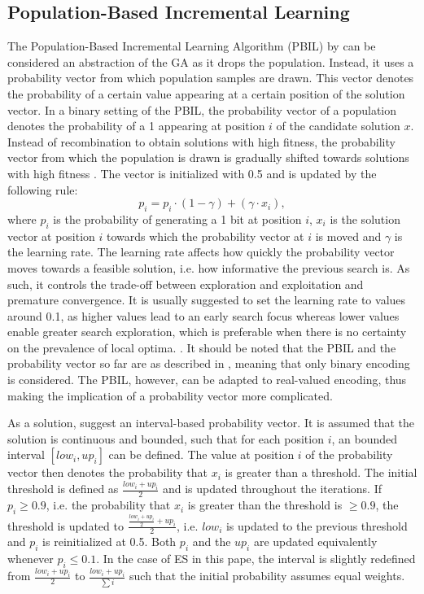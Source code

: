 \subsection{Population-Based Incremental Learning}
The Population-Based Incremental Learning Algorithm (PBIL) by \cite{baluja1994population} can be considered an abstraction of the GA as it drops the population. Instead, it uses a probability vector from which population samples are drawn. This vector denotes the probability of a certain value appearing at a certain position of the solution vector. In a binary setting of the PBIL, the probability vector of a population denotes the probability of a 1 appearing at position $i$ of the candidate solution $x$. Instead of recombination to obtain solutions with high fitness, the probability vector from which the population is drawn is gradually shifted towards solutions with high fitness \cite[p. 11]{baluja1994population}. The vector is initialized with 0.5 and is updated by the following rule:
\begin{equation}
p_i = p_i \cdot (1 - \gamma) + (\gamma \cdot x_i),
\end{equation}
where $p_i$ is the probability of generating a 1 bit at position $i$, $x_i$ is the solution vector at position $i$ towards which the probability vector at $i$ is moved and $\gamma$ is the learning rate. The learning rate affects how quickly the probability vector moves towards a feasible solution, i.e. how informative the previous search is. As such, it controls the trade-off between exploration and exploitation and premature convergence. It is usually suggested to set the learning rate to values around 0.1, as higher values lead to an early search focus whereas lower values enable greater search exploration, which is preferable when there is no certainty on the prevalence of local optima. \cite[p. 16--17]{baluja1994population}.
It should be noted that the PBIL and the probability vector so far are as described in \cite{baluja1994population}, meaning that only binary encoding is considered. The PBIL, however, can be adapted to real-valued encoding, thus making the implication of a probability vector more complicated. 

As a solution, \cite{servet1997telephone} suggest an interval-based probability vector. It is assumed that the solution is continuous and bounded, such that for each position $i$, an bounded interval $[low_i, up_i]$ can be defined. The value at position $i$ of the probability vector then denotes the probability that $x_i$ is greater than a threshold. The initial threshold is defined as $\frac{low_i + up_i}{2}$ and is updated throughout the iterations. If $p_i \geq 0.9$, i.e. the probability that $x_i$ is greater than the threshold is $\geq 0.9$, the threshold is updated to $\frac{\frac{low_i + up_i}{2} + up_i}{2}$, i.e. $low_i$ is updated to the previous threshold and $p_i$ is reinitialized at 0.5. Both $p_i$ and the $up_i$ are updated equivalently whenever $p_i \leq 0.1$. In the case of ES in this pape, the interval is slightly redefined from $\frac{low_i + up_i}{2}$ to $\frac{low_i + up_i}{\sum{i}}$ such that the initial probability assumes equal weights.



